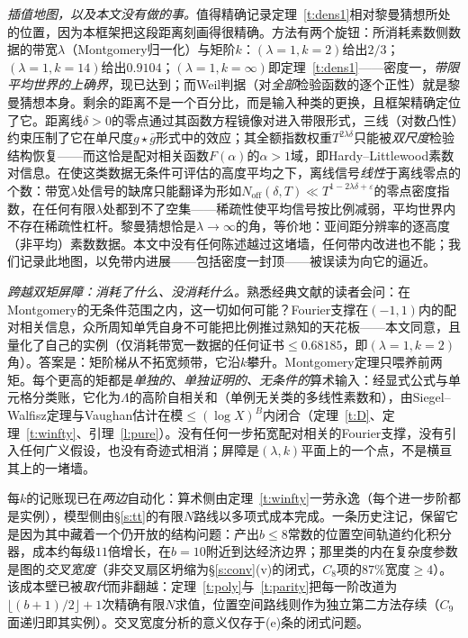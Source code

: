 \documentclass[11pt]{article}
\numberwithin{equation}{section}
\theoremstyle{definition}
\theoremstyle{remark}
\begin{document}
\medskip
\noindent\emph{插值地图，以及本文没有做的事。}值得精确记录定理~\ref{t:dens1}相对黎曼猜想所处的位置，因为本框架把这段距离刻画得很精确。方法有两个旋钮：所消耗素数侧数据的带宽$\lambda$（Montgomery归一化）与矩阶$k$：$(\lambda{=}1,k{=}2)$给出$2/3$；$(\lambda{=}1,k{=}14)$给出$0.9104$；$(\lambda{=}1,k{=}\infty)$即定理~\ref{t:dens1}——密度一，\emph{带限平均世界的上确界}，现已达到；而Weil判据（对\emph{全部}检验函数的逐个正性）就是黎曼猜想本身。剩余的距离不是一个百分比，而是输入种类的更换，且框架精确定位了它。距离线$\delta>0$的零点通过其函数方程镜像对进入带限形式，三线（对数凸性）约束压制了它在单尺度$g\star\bar g$形式中的效应；其全额指数权重$T^{2\lambda\delta}$只能被\emph{双尺度}检验结构恢复——而这恰是配对相关函数$F(\alpha)$的$\alpha>1$域，即Hardy--Littlewood素数对信息。在使这类数据无条件可评估的高度平均之下，离线信号\emph{线性}于离线零点的个数：带宽$\lambda$处信号的缺席只能翻译为形如$N_{\mathrm{off}}(\delta,T)\ll T^{1-2\lambda\delta+\varepsilon}$的零点密度指数，在任何有限$\lambda$处都到不了空集——稀疏性使平均信号按比例减弱，平均世界内不存在稀疏性杠杆。黎曼猜想恰是$\lambda\to\infty$的角，等价地：亚间距分辨率的逐高度（非平均）素数数据。本文中没有任何陈述越过这堵墙，任何带内改进也不能；我们记录此地图，以免带内进展——包括密度一封顶——被误读为向它的逼近。

\medskip
\noindent\emph{跨越双矩屏障：消耗了什么、没消耗什么。}熟悉经典文献的读者会问：在Montgomery的无条件范围之内，这一切如何可能？Fourier支撑在$(-1,1)$内的配对相关信息，众所周知单凭自身不可能把比例推过熟知的天花板——本文同意，且量化了自己的实例（仅消耗带宽一数据的任何证书$\le 0.68185$，即$(\lambda{=}1,k{=}2)$角）。答案是：矩阶梯从不拓宽频带，它沿$k$攀升。Montgomery定理只喂养前两矩。每个更高的矩都是\emph{单独的、单独证明的、无条件的}算术输入：经显式公式与单元格分类账，它化为$\Lambda$的高阶自相关和（单例无关类的多线性素数和），由Siegel--Walfisz定理与Vaughan估计在模$\le(\log X)^{B}$内闭合（定理~\ref{t:D}、定理~\ref{t:winfty}、引理~\ref{l:pure}）。没有任何一步拓宽配对相关的Fourier支撑，没有引入任何广义假设，也没有奇迹式相消；屏障是$(\lambda,k)$平面上的一个点，不是横亘其上的一堵墙。

\medskip
\noindent 
每$k$的记账现已在\emph{两边}自动化：算术侧由定理~\ref{t:winfty}一劳永逸（每个进一步阶都是实例），模型侧由\S\ref{s:tt}的有限$N$路线以多项式成本完成。一条历史注记，保留它是因为其中藏着一个仍开放的结构问题：产出$b\le8$常数的位置空间轨道约化积分器，成本约每级$11$倍增长，在$b=10$附近到达经济边界；那里类的内在复杂度参数是图的\emph{交叉宽度}（非交叉扇区坍缩为\S\ref{s:conv}(v)的闭式，$C_8$项的$87\%$宽度$\ge4$）。该成本壁已被\emph{取代}而非翻越：定理~\ref{t:poly}与~\ref{t:parity}把每一阶改道为$\lfloor(b{+}1)/2\rfloor+1$次精确有限$N$求值，位置空间路线则作为独立第二方法存续（$C_9$面递归即其实例）。交叉宽度分析的意义仅存于(e)条的闭式问题。
\end{document}
